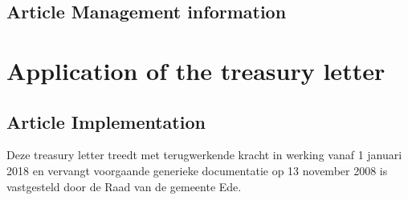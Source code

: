 \subsection*{Article \theartikel \hspace{1em} Management information}


\section*{Application of the treasury letter}
\subsection*{Article \theartikel \hspace{1em} Implementation}
Deze treasury letter treedt met terugwerkende kracht in werking vanaf 1 januari 2018 en vervangt voorgaande generieke documentatie op 13 november 2008 is vastgesteld door de Raad van de gemeente Ede.

